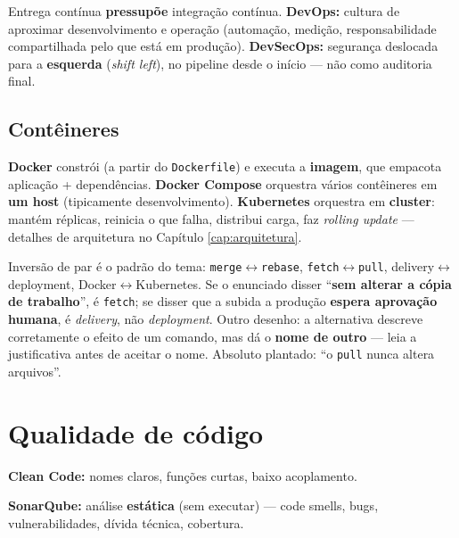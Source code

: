 Entrega contínua \textbf{pressupõe} integração contínua.
\textbf{DevOps:} cultura de aproximar desenvolvimento e operação (automação,
medição, responsabilidade compartilhada pelo que está em produção).
\textbf{DevSecOps:} segurança deslocada para a \textbf{esquerda}
(\textit{shift left}), no pipeline desde o início --- não como auditoria
final.

\subsection{Contêineres}

\textbf{Docker} constrói (a partir do \texttt{Dockerfile}) e executa a
\textbf{imagem}, que empacota aplicação + dependências. \textbf{Docker
Compose} orquestra vários contêineres em \textbf{um host} (tipicamente
desenvolvimento). \textbf{Kubernetes} orquestra em \textbf{cluster}: mantém
réplicas, reinicia o que falha, distribui carga, faz \textit{rolling update}
--- detalhes de arquitetura no Capítulo \ref{cap:arquitetura}.

\begin{pegadinha}
Inversão de par é o padrão do tema: \texttt{merge}$\leftrightarrow$\texttt{rebase},
\texttt{fetch}$\leftrightarrow$\texttt{pull},
delivery$\leftrightarrow$deployment, Docker$\leftrightarrow$Kubernetes. Se o
enunciado disser ``\textbf{sem alterar a cópia de trabalho}'', é
\texttt{fetch}; se disser que a subida a produção \textbf{espera aprovação
humana}, é \textit{delivery}, não \textit{deployment}. Outro desenho: a
alternativa descreve corretamente o efeito de um comando, mas dá o
\textbf{nome de outro} --- leia a justificativa antes de aceitar o nome.
Absoluto plantado: ``o \texttt{pull} nunca altera arquivos''.
\end{pegadinha}

\section{Qualidade de código}

\textbf{Clean Code:} nomes claros, funções curtas, baixo acoplamento.

\textbf{SonarQube:} análise \textbf{estática} (sem executar) --- code
smells, bugs, vulnerabilidades, dívida técnica, cobertura.

